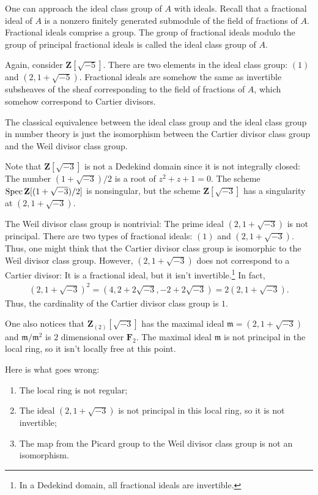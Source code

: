 \documentclass [11 pt, oneside] {article}
\begin{document}
One can approach the ideal class group of $A$ with ideals. Recall that a fractional ideal of $A$ is a nonzero finitely generated submodule of the field of fractions of $A$. Fractional ideals comprise a group. The group of fractional ideals modulo the group of principal fractional ideals is called the ideal class group of $A$.

\begin{example}[ ]\label{}\text{}
Again, consider $\mathbf{Z}[\sqrt{-5}] $. There are two elements in the ideal class group: $(1)$ and $(2,1+\sqrt{-5} )$. Fractional ideals are somehow the same as invertible subsheaves of the sheaf corresponding to the field of fractions of $A$, which somehow correspond to Cartier divisors.
\end{example}

The classical equivalence between the ideal class group and the ideal class group in number theory is just the isomorphism between the Cartier divisor class group and the Weil divisor class group.

\begin{example}[ ]\label{}\text{}
Note that $\mathbf{Z}[\sqrt{-3}] $ is not a Dedekind domain since it is not integrally closed: The number $(1+\sqrt{-3} ) /2$ is a root of $z^2+z+1=0$. The scheme $\operatorname{Spec} \mathbf{Z}[(1+\sqrt{-3} ) /2]$ is nonsingular, but the scheme $\mathbf{Z}[\sqrt{-3}] $ has a singularity at $(2,1+\sqrt{-3} )$.

The Weil divisor class group is nontrivial: The prime ideal $(2,1+\sqrt{-3} )$ is not principal. There are two types of fractional ideals: $(1)$ and $(2,1+\sqrt{-3} )$. Thus, one might think that the Cartier divisor class group is isomorphic to the Weil divisor class group. However, $(2,1+\sqrt{-3} )$ does not correspond to a Cartier divisor: It is a fractional ideal, but it isn't invertible.\footnote{In a Dedekind domain, all fractional ideals are invertible.} In fact, 
\begin{align*}
	(2,1+\sqrt{-3} ) ^2 = (4,2+2\sqrt{-3} ,-2+2\sqrt{-3} ) = 2(2,1+\sqrt{-3} ).
\end{align*}
Thus, the cardinality of the Cartier divisor class group is $1$. 

One also notices that $\mathbf{Z}_{(2)}[ \sqrt{-3}] $ has the maximal ideal $\mathfrak{m}= (2,1+\sqrt{-3} )$ and $\mathfrak{m}/\mathfrak{m}^2$ is $2$ dimensional over $\mathbf{F}_{2}$. The maximal ideal $\mathfrak{m}$ is not principal in the local ring, so it isn't locally free at this point.

Here is what goes wrong:
\begin{enumerate}
	\item The local ring is not regular;
	\item The ideal $(2,1+\sqrt{-3} )$ is not principal in this local ring, so it is not invertible;
	\item The map from the Picard group to the Weil divisor class group is not an isomorphism.
\end{enumerate}

\end{example}
\end{document}

